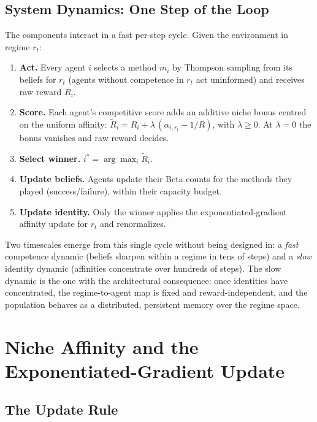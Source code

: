 \documentclass[10pt]{article}
\begin{document}
\subsection{System Dynamics: One Step of the Loop}

The components interact in a fast per-step cycle. Given the environment in
regime $r_t$:

\begin{enumerate}[itemsep=2pt]
    \item \textbf{Act.} Every agent $i$ selects a method $m_i$ by Thompson
    sampling from its beliefs for $r_t$ (agents without competence in $r_t$ act
    uninformed) and receives raw reward $R_i$.
    \item \textbf{Score.} Each agent's competitive score adds an additive niche
    bonus centred on the uniform affinity:
    $\tilde{R}_i = R_i + \lambda\,(\alpha_{i,r_t} - 1/R)$, with $\lambda \ge 0$.
    At $\lambda = 0$ the bonus vanishes and raw reward decides.
    \item \textbf{Select winner.} $i^* = \arg\max_i \tilde{R}_i$.
    \item \textbf{Update beliefs.} Agents update their Beta counts for the
    methods they played (success/failure), within their capacity budget.
    \item \textbf{Update identity.} Only the winner applies the
    exponentiated-gradient affinity update for $r_t$ and renormalizes.
\end{enumerate}

Two timescales emerge from this single cycle without being designed in: a
\emph{fast} competence dynamic (beliefs sharpen within a regime in tens of
steps) and a \emph{slow} identity dynamic (affinities concentrate over hundreds
of steps). The slow dynamic is the one with the architectural consequence: once
identities have concentrated, the regime-to-agent map is fixed and
reward-independent, and the population behaves as a distributed, persistent
memory over the regime space.

\section{Niche Affinity and the Exponentiated-Gradient Update}
\label{sec:affinity}

\subsection{The Update Rule}
\end{document}
